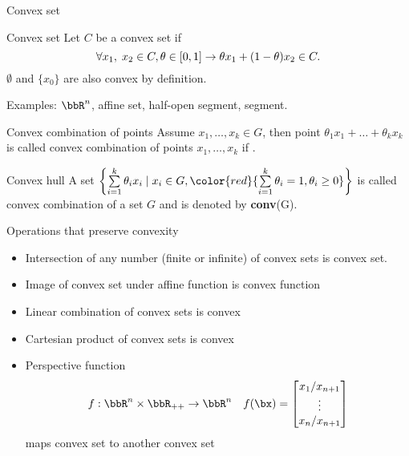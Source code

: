 \documentclass[12pt,russian]{beamer}
\begin{document}
\begin{frame}{Convex set}
\small
\begin{block}{Convex set}
Let $C$ be a convex set if 
\vspace{-4mm}
\[
\forall x_1, \; x_2 \in C, \theta \in [0, 1] \rightarrow \theta x_1 + (1 - \theta)x_2 \in C.
\vspace{-4mm}
\]
$\emptyset$ and $\{ x_0 \}$ are also convex by definition.
\end{block}
Examples: $\bbR^n$, affine set, half-open segment, segment.

\begin{block}{Convex combination of points}
Assume $x_1, \ldots, x_k \in G$, then point $\theta_1 x_1 + \ldots + \theta_k x_k$ is called convex combination of points $x_1,\ldots,x_k$ if {}.
\end{block}

\begin{block}{Convex hull}
A set $\left\{ \sum\limits_{i=1}^k \theta_i x_i \; | \; x_i \in G, {\color{red}{\sum\limits_{i=1}^k \theta_i = 1, \theta_i \geq 0}} \right\}$ is called convex combination of a set $G$ and is denoted by \textbf{conv}(G).
\end{block}

\end{frame}

\begin{frame}{Operations that preserve convexity}
\begin{itemize}
\item Intersection of any number (finite or infinite) of convex sets is convex set.
\item Image of convex set under affine function is convex function
\item Linear combination of convex sets is convex
\item Cartesian product of convex sets is convex
\item Perspective function 
\[
f: \bbR^{n} \times \bbR_{++} \to \bbR^n \quad f(\bx) = \begin{bmatrix}
x_1 / x_{n+1}\\
\vdots \\
x_n / x_{n+1} 
\end{bmatrix}
\] 
 maps convex set to another convex set
\end{itemize}
\end{frame}
\end{document}
